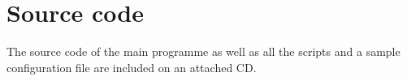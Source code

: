 \documentclass[12pt]{report}
\begin{document}

%

\pagestyle{plain}



\tableofcontents




\listoffigures
\listoftables
	


\appendix
\chapter{Source code}
	The source code of the main programme as well as all the scripts and a sample configuration file are included on an attached CD.
\end{document}
